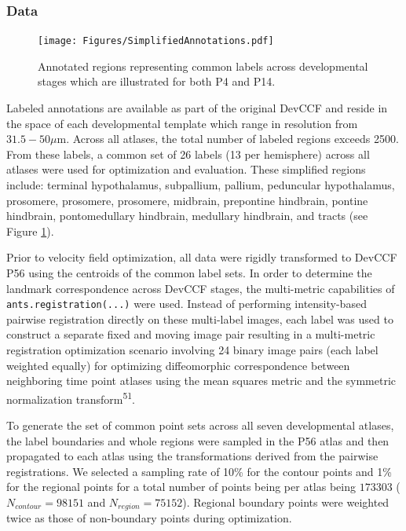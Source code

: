 \documentclass[
  12pt,
]{article}
\begin{document}
\subsubsection{Data}\label{data}

\begin{figure}[!htb]
\centering
\texttt{[image: Figures/SimplifiedAnnotations.pdf]}
\caption{Annotated regions representing common labels across developmental stages which
are illustrated for both P4 and P14.}
\label{fig:simplifiedannotations}
\end{figure}

Labeled annotations are available as part of the original DevCCF and
reside in the space of each developmental template which range in
resolution from \(31.5-50
\mu\)m. Across all atlases, the total number of labeled regions exceeds
2500. From these labels, a common set of 26 labels (13 per hemisphere)
across all atlases were used for optimization and evaluation. These
simplified regions include: terminal hypothalamus, subpallium, pallium,
peduncular hypothalamus, prosomere, prosomere, prosomere, midbrain,
prepontine hindbrain, pontine hindbrain, pontomedullary hindbrain,
medullary hindbrain, and tracts (see Figure
\ref{fig:simplifiedannotations}).

Prior to velocity field optimization, all data were rigidly transformed
to DevCCF P56 using the centroids of the common label sets. In order to
determine the landmark correspondence across DevCCF stages, the
multi-metric capabilities of \texttt{ants.registration(...)} were used.
Instead of performing intensity-based pairwise registration directly on
these multi-label images, each label was used to construct a separate
fixed and moving image pair resulting in a multi-metric registration
optimization scenario involving 24 binary image pairs (each label
weighted equally) for optimizing diffeomorphic correspondence between
neighboring time point atlases using the mean squares metric and the
symmetric normalization transform\textsuperscript{51}.

To generate the set of common point sets across all seven developmental
atlases, the label boundaries and whole regions were sampled in the P56
atlas and then propagated to each atlas using the transformations
derived from the pairwise registrations. We selected a sampling rate of
10\% for the contour points and 1\% for the regional points for a total
number of points being per atlas being \(173303\)
(\(N_{contour} = 98151\) and \(N_{region}=75152\)). Regional boundary
points were weighted twice as those of non-boundary points during
optimization.
\end{document}
